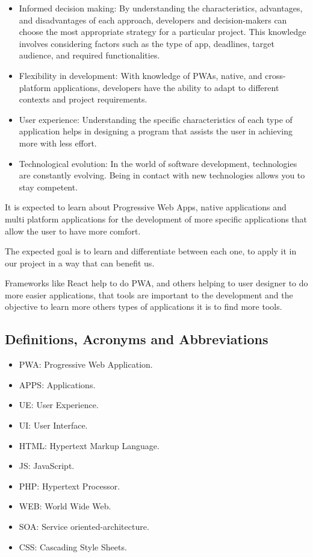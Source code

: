 \documentclass[12pt,a4paper, twosite]{article}
\begin{document}
\begin{itemize}
	\item Informed decision making: By understanding the characteristics, advantages, and disadvantages of each approach, developers and decision-makers can choose the most appropriate strategy for a particular project. This knowledge involves considering factors such as the type of app, deadlines, target audience, and required functionalities.
	
	\item Flexibility in development: With knowledge of PWAs, native, and cross-platform applications, developers have the ability to adapt to different contexts and project requirements.
	
	\item User experience: Understanding the specific characteristics of each type of application helps in designing a program that assists the user in achieving more with less effort.
	
	\item Technological evolution: In the world of software development, technologies are constantly evolving. Being in contact with new technologies allows you to stay competent.
\end{itemize}
	
	It is expected to learn about Progressive Web Apps, native applications and multi platform applications for the development of more specific applications that allow the user to have more comfort. 
	
	The expected goal is to learn and differentiate between each one, to apply it in our project in a way that can benefit us.
	
	Frameworks like React help to do PWA, and others helping to user designer to do more easier applications, that tools are important to the development and the objective to learn more others types of applications it is to find more tools.

	
	\subsection{Definitions, Acronyms and Abbreviations}
	\label{sec:definitions}
	\begin{itemize}
		\item PWA: Progressive Web Application.
		\item APPS: Applications.
		\item UE: User Experience.
		\item UI: User Interface.
		\item HTML: Hypertext Markup Language.
		\item JS: JavaScript.
		\item PHP: Hypertext Processor.
		\item WEB: World Wide Web.
		\item SOA: Service oriented-architecture.
		\item CSS: Cascading Style Sheets.
	\end{itemize}
		
\end{document}

